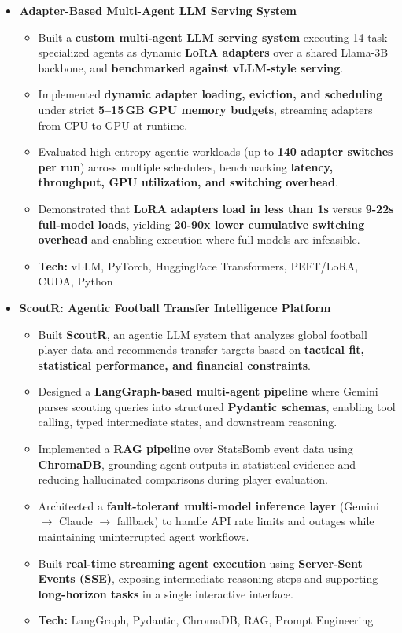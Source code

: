 \documentclass[a4paper,11pt]{article}
\begin{document}
\begin{itemize}
\item \textbf{Adapter-Based Multi-Agent LLM Serving System}
\begin{itemize}[nosep, after=\strut, leftmargin=1.2em, itemsep=2pt]
    \item Built a \textbf{custom multi-agent LLM serving system} executing 14 task-specialized agents as dynamic \textbf{LoRA adapters} over a shared Llama-3B backbone, and \textbf{benchmarked against vLLM-style serving}.
    \item Implemented \textbf{dynamic adapter loading, eviction, and scheduling} under strict \textbf{5--15\,GB GPU memory budgets}, streaming adapters from CPU to GPU at runtime.
    \item Evaluated high-entropy agentic workloads (up to \textbf{140 adapter switches per run}) across multiple schedulers, benchmarking \textbf{latency, throughput, GPU utilization, and switching overhead}.
    \item Demonstrated that \textbf{LoRA adapters load in less than 1s} versus \textbf{9-22s full-model loads}, yielding \textbf{20-90x lower cumulative switching overhead} and enabling execution where full models are infeasible.
    \item \textbf{Tech:} vLLM, PyTorch, HuggingFace Transformers, PEFT/LoRA, CUDA, Python
\end{itemize}

\item \textbf{ScoutR: Agentic Football Transfer Intelligence Platform}
\begin{itemize}[nosep, after=\strut, leftmargin=1.2em, itemsep=2pt]
    \item Built \textbf{ScoutR}, an agentic LLM system that analyzes global football player data and recommends transfer targets based on \textbf{tactical fit, statistical performance, and financial constraints}.
    \item Designed a \textbf{LangGraph-based multi-agent pipeline} where Gemini parses scouting queries into structured \textbf{Pydantic schemas}, enabling tool calling, typed intermediate states, and downstream reasoning.
    \item Implemented a \textbf{RAG pipeline} over StatsBomb event data using \textbf{ChromaDB}, grounding agent outputs in statistical evidence and reducing hallucinated comparisons during player evaluation.
    \item Architected a \textbf{fault-tolerant multi-model inference layer} (Gemini $\rightarrow$ Claude $\rightarrow$ fallback) to handle API rate limits and outages while maintaining uninterrupted agent workflows.
    \item Built \textbf{real-time streaming agent execution} using \textbf{Server-Sent Events (SSE)}, exposing intermediate reasoning steps and supporting \textbf{long-horizon tasks} in a single interactive interface.
    \item \textbf{Tech:} LangGraph, Pydantic, ChromaDB, RAG, Prompt Engineering
\end{itemize}


\end{itemize}
\end{document}
